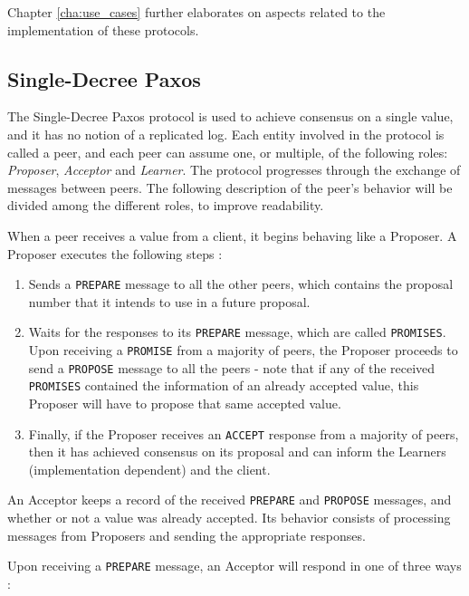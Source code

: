 Chapter \ref{cha:use_cases} further elaborates on aspects related to the implementation of these protocols.


\subsection{Single-Decree Paxos}

The Single-Decree Paxos protocol \cite{paxos_made_simple} is used to achieve consensus on a single value, and it has no notion of a replicated log. Each entity involved in the protocol is called a peer, and each peer can assume one, or multiple, of the following roles: \textit{Proposer}, \textit{Acceptor} and \textit{Learner}. The protocol progresses through the exchange of messages between peers. The following description of the peer’s behavior will be divided among the different roles, to improve readability.

When a peer receives a value from a client, it begins behaving like a Proposer. A Proposer executes the following steps \cite{paxos_made_simple}:

\begin{enumerate}
  \item Sends a \texttt{PREPARE} message to all the other peers, which contains the proposal number that it intends to use in a future proposal.
  \item Waits for the responses to its \texttt{PREPARE} message, which are called \texttt{PROMISES}. Upon receiving a \texttt{PROMISE} from a majority of peers, the Proposer proceeds to send a \texttt{PROPOSE} message to all the peers - note that if any of the received \texttt{PROMISES} contained the information of an already accepted value, this Proposer will have to propose that same accepted value.
  \item Finally, if the Proposer receives an \texttt{ACCEPT} response from a majority of peers, then it has achieved consensus on its proposal and can inform the Learners (implementation dependent) and the client.
\end{enumerate}

An Acceptor keeps a record of the received \texttt{PREPARE} and \texttt{PROPOSE} messages, and whether or not a value was already accepted. Its behavior consists of processing messages from Proposers and sending the appropriate responses.

Upon receiving a \texttt{PREPARE} message, an Acceptor will respond in one of three ways \cite{paxos_made_simple}:

